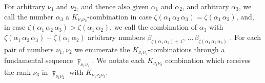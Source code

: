 \documentclass{amsart}
\newcommand\Max[1]{\zeta\left(#1\right)}
\begin{document}
For arbitrary $\nu_1$ and $\nu_2$, and thence also given $\alpha_1$ and
$\alpha_2$, and arbitrary $\alpha_3$, we call the number $\alpha_3$ a
$K_{\nu_1\nu_2}$-combination in case $\Max{\alpha_1\,\alpha_2\,\alpha_3} =
\Max{\alpha_1\,\alpha_2}$, and, in case $\Max{\alpha_1\,\alpha_2\,\alpha_3} >
\Max{\alpha_1\,\alpha_2}$, we  call the combination of
$\alpha_3$ with $\Max{\alpha_1\,\alpha_2\,\alpha_3} - \Max{\alpha_1\,\alpha_2}$
arbitrary numbers $\beta_{\Max{\alpha_1\,\alpha_2} +
1},\,\dots\,\beta_{\Max{\alpha_1\,\alpha_2\,\alpha_3}}$ . For each pair of numbers $\nu_1, \nu_2$ we
enumerate the $K_{\nu_1\nu_2}$-combinations through a fundamental sequence
$\digamma_{\nu_1\nu_2}$. We notate each $K_{\nu_1\nu_2}$ combination which
receives the rank $\nu_3$ in $\digamma_{\nu_1\nu_2}$ with
$K_{\nu_1\nu_2\nu_3}$.
\end{document}
